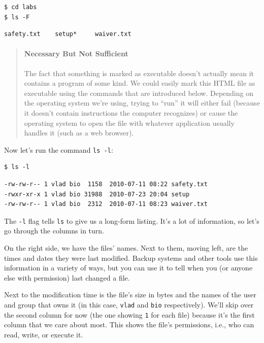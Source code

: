 \documentclass[]{book}
\begin{document}
\begin{verbatim}
$ cd labs
$ ls -F
\end{verbatim}

\begin{verbatim}
safety.txt    setup*     waiver.txt
\end{verbatim}

\begin{quote}
\mbox{}\paragraph{Necessary But Not Sufficient}

The fact that something is marked as executable doesn't actually mean it
contains a program of some kind. We could easily mark this HTML file as
executable using the commands that are introduced below. Depending on
the operating system we're using, trying to ``run'' it will either fail
(because it doesn't contain instructions the computer recognizes) or
cause the operating system to open the file with whatever application
usually handles it (such as a web browser).
\end{quote}

Now let's run the command \texttt{ls -l}:

\begin{verbatim}
$ ls -l
\end{verbatim}

\begin{verbatim}
-rw-rw-r-- 1 vlad bio  1158  2010-07-11 08:22 safety.txt
-rwxr-xr-x 1 vlad bio 31988  2010-07-23 20:04 setup
-rw-rw-r-- 1 vlad bio  2312  2010-07-11 08:23 waiver.txt
\end{verbatim}

The \texttt{-l} flag tells \texttt{ls} to give us a long-form listing.
It's a lot of information, so let's go through the columns in turn.

On the right side, we have the files' names. Next to them, moving left,
are the times and dates they were last modified. Backup systems and
other tools use this information in a variety of ways, but you can use
it to tell when you (or anyone else with permission) last changed a
file.

Next to the modification time is the file's size in bytes and the names
of the user and group that owns it (in this case, \texttt{vlad} and
\texttt{bio} respectively). We'll skip over the second column for now
(the one showing \texttt{1} for each file) because it's the first column
that we care about most. This shows the file's permissions, i.e., who
can read, write, or execute it.
\end{document}
